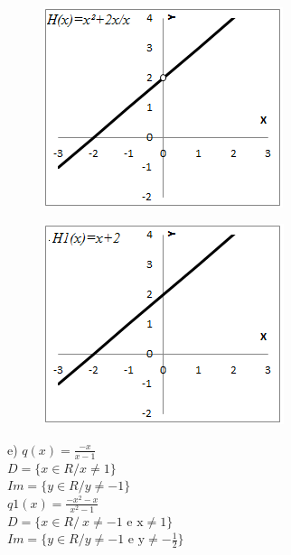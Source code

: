 \begin{respostas}{3}
	\begin{figure}[H]
		\begin{Center}
			\includegraphics[width=2.76in,height=2.31in]{capitulos/outras_funcoes/media/image51.png}
		\end{Center}
	\end{figure}

	\begin{figure}[H]
		\begin{Center}
			\includegraphics[width=2.77in,height=2.31in]{capitulos/outras_funcoes/media/image52.png}
		\end{Center}
	\end{figure}

	e) \(q \left( x \right) =\frac{-x}{x- 1}\)\\ \(D= \{ x \in R/x \neq 1  \}  \) \\\( Im= \{ y \in R/y \neq -1  \}  \)\\

 	\( q1 \left( x \right) =\frac{-x^{2}-x}{x^2- 1}\)\\ \(D= \{ x \in R/~x \neq -1\text{ e x} \neq 1  \}  \)\\\( Im= \{ y \in R/y \neq -1\text{ e y} \neq -\frac{1}{2} \} \)


\end{respostas}
